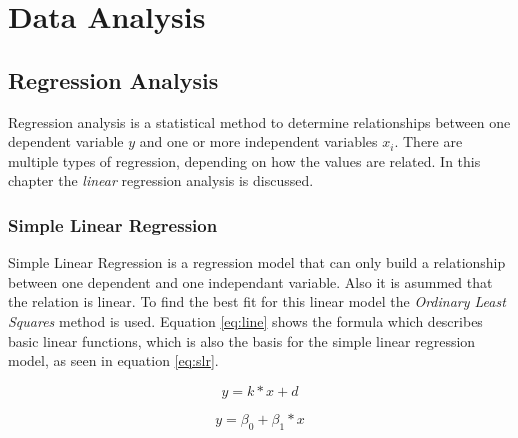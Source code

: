 \chapter{Data Analysis}
\label{ch:dataanalysis}










\section {Regression Analysis}

Regression analysis is a statistical method to determine relationships between one dependent variable $ y $ and one or more independent variables $ x_i $. There are multiple types of regression, depending on how the values are related. In this chapter the \textit{linear} regression analysis is discussed.

\subsection{Simple Linear Regression}

Simple Linear Regression is a regression model that can only build a relationship between one dependent and one independant variable. Also it is asummed that the relation is linear. To find the best fit for this linear model the \textit{Ordinary Least Squares} method is used. Equation \vref{eq:line} shows the formula which describes basic linear functions, which is also the basis for the simple linear regression model, as seen in equation \vref{eq:slr}.

\begin{equation}
\label{eq:line}
    y = k * x + d
\end{equation}

\begin{equation}
\label{eq:slr}
    y = \beta_0 + \beta_1 * x
\end{equation}

